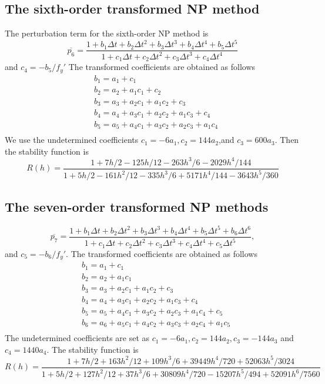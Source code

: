 \documentclass[review]{elsarticle}
\theoremstyle{plain}\newtheorem{definition}{\sc{Definition}}
\theoremstyle{defination}\newtheorem{example}{Example}[section]
\numberwithin{equation}{section}
\numberwithin{table}{section}
\begin{document}
{   \subsection{The  sixth-order transformed NP method} 
The perturbation term for the sixth-order NP method is
\begin{equation}
  \overline{p_6} = \frac{1+b_1 \Delta t + b_2 \Delta t^2 +b_3\Delta t^3+b_4\Delta t^4 +b_5 \Delta t^5}{1+c_1 \Delta t +c_2 \Delta t^2+c_3 \Delta t^3 +c_4 \Delta t^4}
  \end{equation}
  and 
$c_4= -b_5/f_y'$
The transformed coefficients are obtained as follows
\begin{equation}
  \begin{aligned}
  &b_1=a_1+c_1\\
  &b_2=a_2+a_1c_1+c_2\\
  &b_3=a_3+a_2c_1+a_1c_2+c_3\\
  &b_4=a_4+a_3c_1+a_2c_2+a_1c_3+c_4\\
  &b_5=a_5+a_4c_1+a_3c_2+a_2c_3+a_1c_4\\
  \end{aligned}
 \end{equation}
We use the undetermined coefficients $c_1=-6a_1,c_2=144a_2$,and $c_3=600a_3$. Then the stability function is
\begin{equation}
  R(h)=\frac{1+7h/2-125h/12-263h^3/6-2029h^4/144}{1+5h/2-161h^2/12-335h^3/6+5171h^4/144-3643h^5/360}
  \end{equation}

	\subsection{The  seven-order transformed NP methods}
\begin{equation}
  \overline{p_7} = \frac{1+b_1 \Delta t + b_2 \Delta t^2 +b_3\Delta t^3 +b_4\Delta t^4  +b_5 \Delta t^5 +b_6\Delta t^6}{1+c_1 \Delta t+c_2 \Delta t^2 +c_3 \Delta t^3+c_4 \Delta t^4 +c_5 \Delta t^5},
  \end{equation}
  and $c_5=-b_6 /f_y'$.
The transformed coefficients are obtained as follows
\begin{equation}
  \begin{aligned}
  &b_1=a_1+c_1\\
  &b_2=a_2+a_1c_1\\
  &b_3=a_3+a_2c_1+a_1c_2+c_3\\
  &b_4=a_4+a_3c_1+a_2c_2+a_1c_3+c_4\\
  &b_5=a_5+a_4c_1+a_3c_2+a_2c_3+a_1c_4+c_5\\
  &b_6=a_6+a_5c_1+a_4c_2+a_3c_3+a_2c_4+a_1c_5\\
  \end{aligned}
 \end{equation}
The undetermined coefficients are set as  $c_1=-6a_1,c_2=144a_2, c_3=-144a_3$ and $c_4=1440a_4$. The stability function is 
\begin{equation}
  R(h)=
  \frac{1+7h/2+163h^2/12+109h^3/6+39449h^4/720+52063h^5/3024}{1+5h/2+127h^2/12+37h^3/6+30809h^4/720-15207h^5/494+52091h^6/7560}
\end{equation}
}
\end{document}
